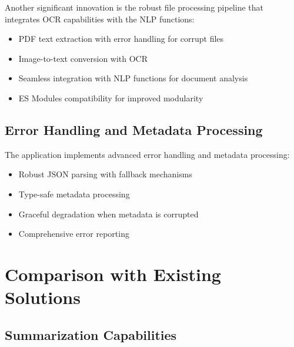 \documentclass[12pt,a4paper]{article}
\begin{document}
Another significant innovation is the robust file processing pipeline that integrates OCR capabilities with the NLP functions:

\begin{itemize}
    \item PDF text extraction with error handling for corrupt files
    \item Image-to-text conversion with OCR
    \item Seamless integration with NLP functions for document analysis
    \item ES Modules compatibility for improved modularity
\end{itemize}

\subsection{Error Handling and Metadata Processing}

The application implements advanced error handling and metadata processing:

\begin{itemize}
    \item Robust JSON parsing with fallback mechanisms
    \item Type-safe metadata processing
    \item Graceful degradation when metadata is corrupted
    \item Comprehensive error reporting
\end{itemize}

\section{Comparison with Existing Solutions}

\subsection{Summarization Capabilities}
\end{document}
